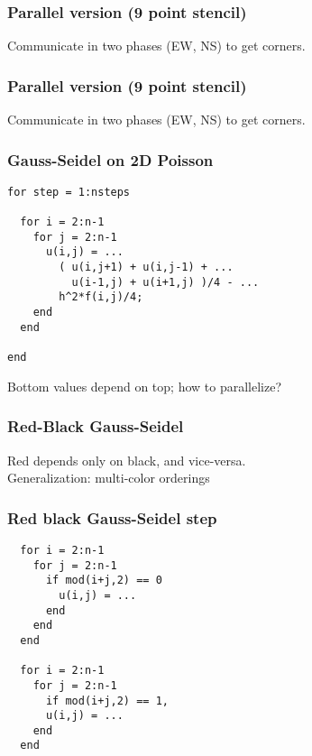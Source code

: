 \documentclass{beamer}
\begin{document}
\begin{frame}
  \frametitle{Parallel version (9 point stencil)}

  \begin{center}
    
    
  Communicate in two phases (\alert{EW}, NS) to get corners.
  \end{center}
\end{frame}


\begin{frame}
  \frametitle{Parallel version (9 point stencil)}

  \begin{center}
    

  Communicate in two phases (EW, \alert{NS}) to get corners.
  \end{center}
\end{frame}


\begin{frame}[fragile]
  \frametitle{Gauss-Seidel on 2D Poisson}

\begin{lstlisting}
for step = 1:nsteps

  for i = 2:n-1
    for j = 2:n-1
      u(i,j) = ...
        ( u(i,j+1) + u(i,j-1) + ...
          u(i-1,j) + u(i+1,j) )/4 - ...
        h^2*f(i,j)/4;
    end
  end

end
\end{lstlisting}
Bottom values depend on top; how to parallelize?

\end{frame}


\begin{frame}[fragile]
  \frametitle{Red-Black Gauss-Seidel}

  \begin{center}
    

  \vspace{5mm}
  Red depends only on black, and vice-versa. \\
  Generalization: multi-color orderings
  \end{center}
\end{frame}


\begin{frame}[fragile]
  \frametitle{Red black Gauss-Seidel step}

\begin{lstlisting}
  for i = 2:n-1
    for j = 2:n-1
      if mod(i+j,2) == 0
        u(i,j) = ...
      end
    end
  end

  for i = 2:n-1
    for j = 2:n-1
      if mod(i+j,2) == 1,
      u(i,j) = ...
    end
  end
\end{lstlisting}

\end{frame}
\end{document}
